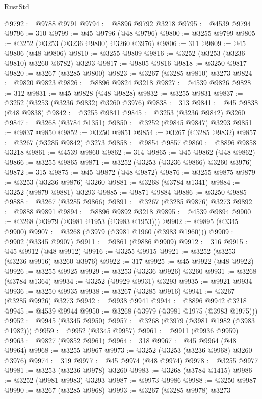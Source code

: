 \begin{lexlean}{RustStd}
\begin{coremodule}
{\begin{coremodule}
{{{{{{{{{{{{{{{{{{{{{{{{{{{{{{{{{{{{{{{@9792 := @9788 @9791
@9794 := @8896 @9792 @3218
@9795 := @4539 @9794
@9796 := 310
@9799 := @45 @9796 (@48 @9796)
@9800 := @3255 @9799
@9805 := @3252 (@3253 (@3236 @9800) @3260 @3976)
@9806 := 311
@9809 := @45 @9806 (@48 @9806)
@9810 := @3255 @9809
@9816 := @3252 (@3253 (@3236 @9810) @3260 @6782) @3293
@9817 := @9805 @9816
@9818 := @3250 @9817
@9820 := @3267 (@3285 @9800)
@9823 := @3267 (@3285 @9810) @3273
@9824 := @9820 @9823
@9826 := @8896 @9824 @3218
@9827 := @4539 @9826
@9828 := 312
@9831 := @45 @9828 (@48 @9828)
@9832 := @3255 @9831
@9837 := @3252 (@3253 (@3236 @9832) @3260 @3976)
@9838 := 313
@9841 := @45 @9838 (@48 @9838)
@9842 := @3255 @9841
@9845 := @3253 (@3236 @9842) @3260
@9847 := @3268 (@3784 @1351)
@9850 := @3252 (@9845 @9847) @3293
@9851 := @9837 @9850
@9852 := @3250 @9851
@9854 := @3267 (@3285 @9832)
@9857 := @3267 (@3285 @9842) @3273
@9858 := @9854 @9857
@9860 := @8896 @9858 @3218
@9861 := @4539 @9860
@9862 := 314
@9865 := @45 @9862 (@48 @9862)
@9866 := @3255 @9865
@9871 := @3252 (@3253 (@3236 @9866) @3260 @3976)
@9872 := 315
@9875 := @45 @9872 (@48 @9872)
@9876 := @3255 @9875
@9879 := @3253 (@3236 @9876) @3260
@9881 := @3268 (@3784 @1341)
@9884 := @3252 (@9879 @9881) @3293
@9885 := @9871 @9884
@9886 := @3250 @9885
@9888 := @3267 (@3285 @9866)
@9891 := @3267 (@3285 @9876) @3273
@9892 := @9888 @9891
@9894 := @8896 @9892 @3218
@9895 := @4539 @9894
@9900 := @3268 (@3979 (@3981 @1953 (@3983 @1953)))
@9902 := @9895 (@3345 @9900)
@9907 := @3268 (@3979 (@3981 @1960 (@3983 @1960)))
@9909 := @9902 (@3345 @9907)
@9911 := @9861 (@9886 @9909)
@9912 := 316
@9915 := @45 @9912 (@48 @9912)
@9916 := @3255 @9915
@9921 := @3252 (@3253 (@3236 @9916) @3260 @3976)
@9922 := 317
@9925 := @45 @9922 (@48 @9922)
@9926 := @3255 @9925
@9929 := @3253 (@3236 @9926) @3260
@9931 := @3268 (@3784 @1364)
@9934 := @3252 (@9929 @9931) @3293
@9935 := @9921 @9934
@9936 := @3250 @9935
@9938 := @3267 (@3285 @9916)
@9941 := @3267 (@3285 @9926) @3273
@9942 := @9938 @9941
@9944 := @8896 @9942 @3218
@9945 := @4539 @9944
@9950 := @3268 (@3979 (@3981 @1975 (@3983 @1975)))
@9952 := @9945 (@3345 @9950)
@9957 := @3268 (@3979 (@3981 @1982 (@3983 @1982)))
@9959 := @9952 (@3345 @9957)
@9961 := @9911 (@9936 @9959)
@9963 := @9827 (@9852 @9961)
@9964 := 318
@9967 := @45 @9964 (@48 @9964)
@9968 := @3255 @9967
@9973 := @3252 (@3253 (@3236 @9968) @3260 @3976)
@9974 := 319
@9977 := @45 @9974 (@48 @9974)
@9978 := @3255 @9977
@9981 := @3253 (@3236 @9978) @3260
@9983 := @3268 (@3784 @1415)
@9986 := @3252 (@9981 @9983) @3293
@9987 := @9973 @9986
@9988 := @3250 @9987
@9990 := @3267 (@3285 @9968)
@9993 := @3267 (@3285 @9978) @3273
}}}}}}}}}}}}}}}}}}}}}}}}}}}}}}}}}}}}}}}
\end{coremodule}}
\end{coremodule}
\end{lexlean}

